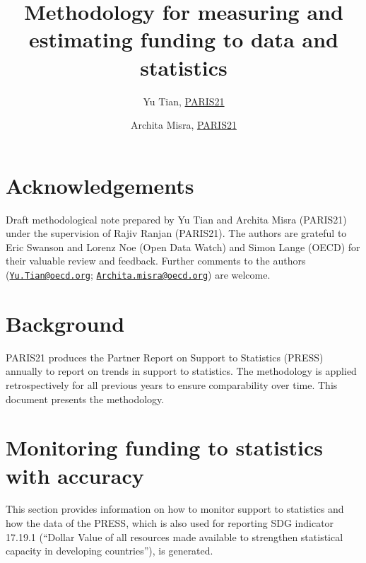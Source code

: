 \documentclass[
]{article}
\title{Methodology for measuring and estimating funding to data and statistics}
\author{Yu Tian, \href{https://paris21.org/about-paris21/our-team/yu-tian}{PARIS21} \and Archita Misra, \href{https://www.paris21.org}{PARIS21}}
\date{}
\begin{document}
\maketitle

{
\setcounter{tocdepth}{2}
\tableofcontents
}
\hypertarget{acknowledgements}{%
\section*{Acknowledgements}\label{acknowledgements}}

Draft methodological note prepared by Yu Tian and Archita Misra (PARIS21) under the supervision of Rajiv
Ranjan (PARIS21). The authors are grateful to Eric Swanson and Lorenz Noe (Open Data Watch) and Simon Lange
(OECD) for their valuable review and feedback. Further comments to the authors (\href{mailto:Yu.Tian@oecd.org}{\nolinkurl{Yu.Tian@oecd.org}};
\href{mailto:Archita.misra@oecd.org}{\nolinkurl{Archita.misra@oecd.org}}) are welcome.

\hypertarget{background}{%
\section{Background}\label{background}}

PARIS21 produces the Partner Report on Support to Statistics (PRESS) annually to report on trends in
support to statistics. The methodology is applied retrospectively for all previous years to ensure
comparability over time. This document presents the methodology.

\hypertarget{monitoring-funding-to-statistics-with-accuracy}{%
\section{Monitoring funding to statistics with accuracy}\label{monitoring-funding-to-statistics-with-accuracy}}

This section provides information on how to monitor support to statistics and how the data of the
PRESS, which is also used for reporting SDG indicator 17.19.1 (``Dollar Value of all resources made
available to strengthen statistical capacity in developing countries''), is generated.
\end{document}
